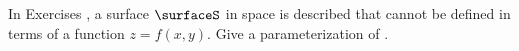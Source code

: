 {\noindent In Exercises}
{, a surface $\surfaceS$ in space is described that cannot be defined in terms of a function $z=f(x,y)$. Give a parameterization of \surfaceS.
}
